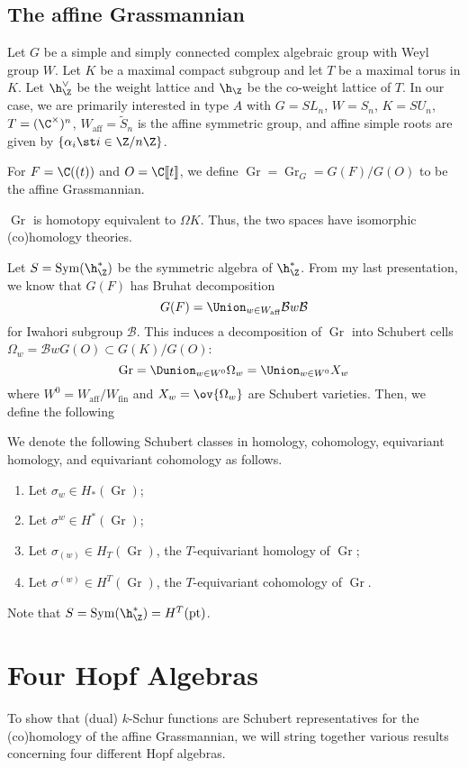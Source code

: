 \documentclass[11pt,leqno,oneside]{amsart}
\numberwithin{thm}{section}
\renewcommand{\W}{W}
\newcommand{\Waff}{\W_{\text{aff}}}
\newcommand{\eS}{\tilde{S}}
\newcommand{\Gr}{\operatorname{Gr}}
\newcommand{\Bc}{\mathcal{B}}
\begin{document}
\subsection{The affine Grassmannian}
Let \(G\) be a simple and simply connected complex algebraic group
with Weyl group \(\W\). Let \(K\) be a maximal compact subgroup and
let \(T\) be a maximal torus in \(K\). Let \(\h_\Z^\vee\) be the
weight lattice and \(\h_\Z\) be the co-weight lattice of \(T\). In our
case, we are primarily interested in type \(A\) with \(G = SL_n\), \(\W = S_n\), \(K =
SU_n\), \(T = (\C^\times)^n\), \(\Waff = \eS_n\) is the affine symmetric group, and
affine simple roots are given by \(\{\alpha_i \st i \in \Z/n\Z\}\).

For \(F = \C((t))\) and \(O = \C \llbracket t \rrbracket\), we define
\(\Gr = \Gr_G = G(F)/G(O)\) to be the affine Grassmannian.
\begin{prop}
 \(\Gr\) is homotopy equivalent to \(\Omega K\). Thus, the two spaces
 have isomorphic (co)homology theories.
\end{prop}
Let \(S = \operatorname{Sym}(\h_\Z^*)\) be the
symmetric algebra of \(\h^*_\Z\). From my last presentation, we know
that \(G(F)\) has Bruhat decomposition \[
  G(F) = \Union_{w \in \Waff} \Bc w \Bc
\]
for Iwahori subgroup \(\Bc\). This induces a decomposition of \(\Gr\)
into Schubert cells \(\Omega_w = \Bc w G(O) \subset G(K)/G(O)\): \[
  \Gr = \Dunion_{w \in \W^0} \Omega_w = \Union_{w \in W^0} X_w
\]
where \(W^0 = \Waff/W_{\text{fin}}\) and \(X_w = \ov{\Omega_w}\) are
Schubert varieties. Then, we define the following
\begin{defn}
  We denote the following Schubert classes in homology, cohomology,
  equivariant homology, and equivariant cohomology as follows.
  \begin{enumerate}
  \item Let \(\sigma_w \in H_*(\Gr)\);
  \item Let \(\sigma^w \in H^*(\Gr)\);
  \item Let \(\sigma_{(w)} \in H_T(\Gr)\), the \(T\)-equivariant
    homology of \(\Gr\);
  \item Let \(\sigma^{(w)} \in H^T(\Gr)\), the \(T\)-equivariant
    cohomology of \(\Gr\).
  \end{enumerate}
\end{defn}
\begin{rmk}
  Note that \(S = \operatorname{Sym}(\h_\Z^*) = H^T(\text{pt})\).
\end{rmk}
\section{Four Hopf Algebras}
To show that (dual) \(k\)-Schur functions are Schubert representatives for
the (co)homology of the affine Grassmannian, we will string together
various results concerning four different Hopf algebras.
\end{document}
